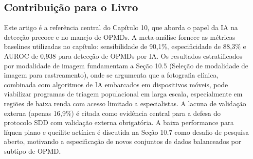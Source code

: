 \subsection{Contribuição para o Livro}
Este artigo é a referência central do Capítulo 10, que aborda o papel
da IA na detecção precoce e no manejo de OPMDs. A meta-análise fornece
as métricas baselines utilizadas no capítulo: sensibilidade de 90,1\%,
especificidade de 88,3\% e AUROC de 0,938 para detecção de OPMDs por
IA. Os resultados estratificados por modalidade de imagem fundamentam
a Seção 10.5 (Seleção de modalidade de imagem para rastreamento), onde
se argumenta que a fotografia clínica, combinada com algoritmos de IA
embarcados em dispositivos móveis, pode viabilizar programas de
triagem populacional em larga escala, especialmente em regiões de
baixa renda com acesso limitado a especialistas. A lacuna de validação
externa (apenas 16,9\%) é citada como evidência central para a defesa
do protocolo SDD com validação externa obrigatória. A baixa performance
para líquen plano e queilite actínica é discutida na Seção 10.7 como
desafio de pesquisa aberto, motivando a especificação de novos conjuntos
de dados balanceados por subtipo de OPMD.

